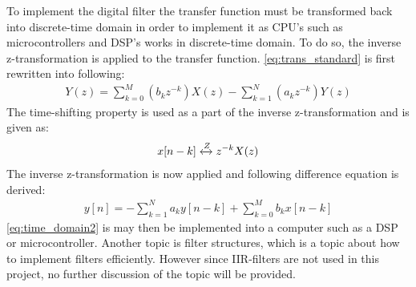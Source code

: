 To implement the digital filter the transfer function must be transformed back into discrete-time domain in order to implement it as CPU's such as microcontrollers and DSP's works in discrete-time domain. To do so, the inverse z-transformation is applied to the transfer function. \autoref{eq:trans_standard} is first rewritten into following:
\begin{align}
Y(z) = \sum\limits_{k=0}^{M}(b_kz^{-k})X(z) -\sum\limits_{k=1}^{N}(a_kz^{-k})Y(z)
\label{eq:z_domain_trans}
\end{align}
The time-shifting property is used as a part of the inverse z-transformation and is given as:
\begin{align}
x[n-k] \xleftrightarrow{Z} z^{-k} X(z)
\label{eq:time_shifting}
\end{align}
The inverse z-transformation is now applied and following difference equation is derived:
\begin{align}
y[n] = -\sum\limits_{k=1}^{N}a_ky[n-k] + \sum\limits_{k=0}^{M}b_kx[n-k]
\label{eq:time_domain2}
\end{align}
\autoref{eq:time_domain2} is may then be implemented into a computer such as a DSP or microcontroller. Another topic is filter structures, which is a topic about how to implement filters efficiently. However since IIR-filters are not used in this project, no further discussion of the topic will be provided.










